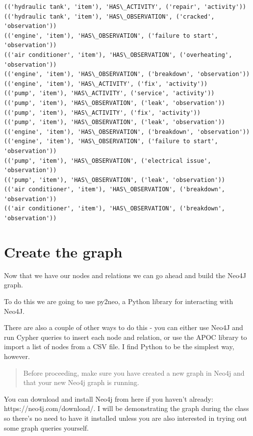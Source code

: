\documentclass[11pt]{article}
\begin{document}
    \begin{Verbatim}[commandchars=\\\{\}]
(('hydraulic tank', 'item'), 'HAS\_ACTIVITY', ('repair', 'activity'))
(('hydraulic tank', 'item'), 'HAS\_OBSERVATION', ('cracked', 'observation'))
(('engine', 'item'), 'HAS\_OBSERVATION', ('failure to start', 'observation'))
(('air conditioner', 'item'), 'HAS\_OBSERVATION', ('overheating', 'observation'))
(('engine', 'item'), 'HAS\_OBSERVATION', ('breakdown', 'observation'))
(('engine', 'item'), 'HAS\_ACTIVITY', ('fix', 'activity'))
(('pump', 'item'), 'HAS\_ACTIVITY', ('service', 'activity'))
(('pump', 'item'), 'HAS\_OBSERVATION', ('leak', 'observation'))
(('pump', 'item'), 'HAS\_ACTIVITY', ('fix', 'activity'))
(('pump', 'item'), 'HAS\_OBSERVATION', ('leak', 'observation'))
(('engine', 'item'), 'HAS\_OBSERVATION', ('breakdown', 'observation'))
(('engine', 'item'), 'HAS\_OBSERVATION', ('failure to start', 'observation'))
(('pump', 'item'), 'HAS\_OBSERVATION', ('electrical issue', 'observation'))
(('pump', 'item'), 'HAS\_OBSERVATION', ('leak', 'observation'))
(('air conditioner', 'item'), 'HAS\_OBSERVATION', ('breakdown', 'observation'))
(('air conditioner', 'item'), 'HAS\_OBSERVATION', ('breakdown', 'observation'))
    \end{Verbatim}

    \hypertarget{create-the-graph}{%
\section{Create the graph}\label{create-the-graph}}

Now that we have our nodes and relations we can go ahead and build the
Neo4J graph.

To do this we are going to use py2neo, a Python library for interacting
with Neo4J.

There are also a couple of other ways to do this - you can either use
Neo4J and run Cypher queries to insert each node and relation, or use
the APOC library to import a list of nodes from a CSV file. I find
Python to be the simplest way, however.

\begin{quote}
Before proceeding, make sure you have created a new graph in Neo4j and
that your new Neo4j graph is running.
\end{quote}

You can download and install Neo4j from here if you haven't already:
https://neo4j.com/download/. I will be demonstrating the graph during
the class so there's no need to have it installed unless you are also
interested in trying out some graph queries yourself.
\end{document}
